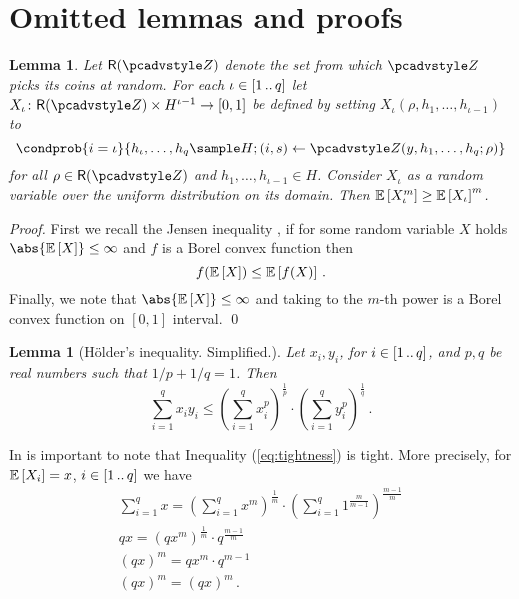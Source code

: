 \documentclass[runningheads,11pt]{llncs}
\newtheorem{lemma}[theorem]{Lemma} \newtheorem{corollary}[theorem]{Corollary}
\theoremstyle{definition} \newtheorem{definition}[theorem]{Definition}
\begin{document}
\section{Omitted lemmas and proofs}
\begin{lemma}\label{lem:jensen}
	Let $\RND{\zdv}$ denote the set from which $\zdv$ picks its coins at random.
	For each $\iota \in [1 \, .. \, q]$ let $X_\iota \colon \RND{\zdv} \times
	H^{\iota - 1} \to [0, 1]$ be defined by setting $X_\iota(\rho, h_1, \ldots,
h_{\iota - 1})$ to 
\[
  \condprob{i = \iota}{h_\iota, \ldots, h_q \sample H; (i, s) \gets \zdv(y, h_1,
    \ldots, h_q; \rho)}
	\] 
	for all $\rho \in \RND{\zdv}$ and $h_1, \ldots, h_{\iota - 1} \in H$. Consider
  $X_\iota$ as a random variable over the uniform distribution on its domain.
  Then $\mathbb{E}\left[X_\iota^m\right] \geq \mathbb{E}\left[X_\iota\right]^m$.
\end{lemma}
\begin{proof}
	First we recall the Jensen inequality \cite{W:Weissten20}, if for some random
  variable $X$ holds $\abs{\expected{X}} \leq \infty$ and $f$ is a Borel convex
  function then
	\[
		f(\mathbb{E}\left[X\right]) \leq \mathbb{E}\left[f(X)\right]\,.
	\] 
	Finally, we note that $\abs{\expected{X}} \leq \infty$ and taking to the
  $m$-th power is a Borel convex function on $[0, 1]$ interval. \qed
\end{proof}

\begin{lemma}[H\"older's inequality. Simplified.]\label{lem:holder}
	Let $x_i, y_i$, for $i \in [1 \, .. \, q]$, and $p, q$ be real numbers such that
  $1/p + 1/q = 1$. Then
	\[
		\sum_{i = 1}^{q} x_i y_i \leq \left(\sum_{i = 1}^{q}
      x_i^p\right)^{\frac{1}{p}} \cdot \left(\sum_{i = 1}^{q}
      y_i^p\right)^{\frac{1}{q}}\,.
	\]
\end{lemma}

\begin{remark}
	In is important to note that Inequality (\ref{eq:tightness}) is tight. More
  precisely, for $\mathbb{E}\left[X_i\right] = x$, $i \in [1 \, .. \, q]$ we have
	\begin{gather*}
		\sum_{i = 1}^q x = \left(\sum_{i = 1}^{q} x^m\right)^\frac{1}{m} \cdot \left(\sum_{i = 1}^{q} 1^{\frac{m}{m - 1}}\right)^{\frac{m - 1}{m}} \\
		qx = \left(qx^m\right)^\frac{1}{m} \cdot q^{\frac{m - 1}{m}} \\
		(qx)^m = qx^m \cdot q^{m - 1} \\
		(qx)^m = (qx)^m\,.
	\end{gather*}
\end{remark}
\end{document}
